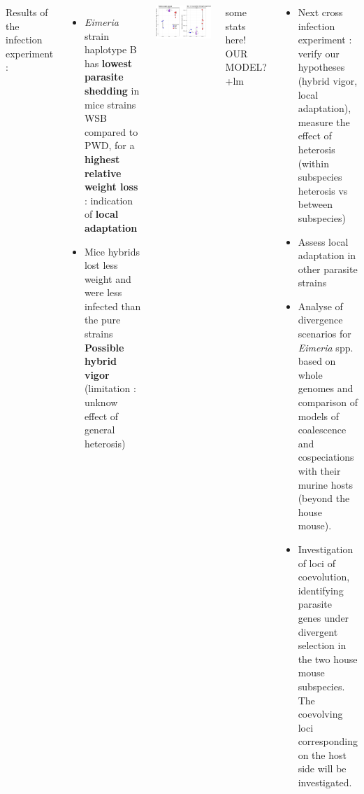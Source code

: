 \documentclass[30pt, a0paper, portrait, margin=0mm, innermargin=15mm,
               blockverticalspace=15mm, colspace=15mm, subcolspace=8mm]{tikzposter}
\begin{document}
\begin{columns}
{}


{ Results of the infection experiment : 
  \begin{itemize}
    \item \textit{Eimeria} strain haplotype B has \textbf{lowest parasite shedding} in mice strains WSB compared to PWD, for a \textbf{highest relative weight loss} : indication of \textbf{local adaptation}
    \item Mice hybrids lost less weight and  were less infected than the pure strains\\ \textbf{Possible hybrid vigor} (limitation : unknow effect of general heterosis)\\
  \end{itemize}

  \begin{center}
  \includegraphics[scale=1.1]{May2017_E64.pdf}

  \end{center}
  
  some stats here!
  OUR MODEL? +lm
}

{
  \begin{center}
  \begin{itemize}
        \item Next cross infection experiment : verify our hypotheses (hybrid vigor, local adaptation), measure the effect of heterosis (within subspecies heterosis vs between subspecies)
        \item Assess local adaptation in other parasite strains
        \item Analyse of divergence scenarios for \textit{Eimeria} spp. based on whole genomes and comparison of models of coalescence and cospeciations with their murine hosts (beyond the house mouse).
        \item Investigation of loci of coevolution, identifying parasite genes under divergent selection in the two house mouse subspecies. The coevolving loci corresponding on the host side will be investigated.
  \end{itemize}


\end{center}}
\end{columns}
\end{document}
